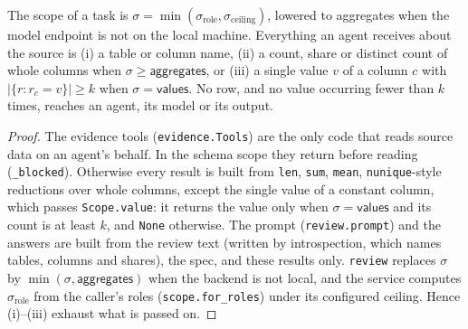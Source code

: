 \begin{proposition}\label{prop:agscope}
The scope of a task is $\sigma=\min(\sigma_{\text{role}},\sigma_{\text{ceiling}})$, lowered to \textsf{aggregates}
when the model endpoint is not on the local machine. Everything an agent receives about the source is (i) a table or
column name, (ii) a count, share or distinct count of whole columns when $\sigma\ge\textsf{aggregates}$, or (iii) a
single value $v$ of a column $c$ with $|\{r:r_c=v\}|\ge k$ when $\sigma=\textsf{values}$. No row, and no value
occurring fewer than $k$ times, reaches an agent, its model or its output.
\end{proposition}
\begin{proof}
The evidence tools (\texttt{evidence.Tools}) are the only code that reads source data on an agent's behalf. In the
\textsf{schema} scope they return before reading (\texttt{\_blocked}). Otherwise every result is built from
\texttt{len}, \texttt{sum}, \texttt{mean}, \texttt{nunique}-style reductions over whole columns, except the single
value of a constant column, which passes \texttt{Scope.value}: it returns the value only when $\sigma=\textsf{values}$
and its count is at least $k$, and \texttt{None} otherwise. The prompt (\texttt{review.prompt}) and the answers are
built from the review text (written by introspection, which names tables, columns and shares), the spec, and these
results only. \texttt{review} replaces $\sigma$ by $\min(\sigma,\textsf{aggregates})$ when the backend is not local,
and the service computes $\sigma_{\text{role}}$ from the caller's roles (\texttt{scope.for\_roles}) under its
configured ceiling. Hence (i)--(iii) exhaust what is passed on.
\end{proof}

